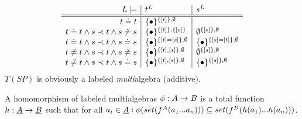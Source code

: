 \documentclass[10pt]{article}
\begin{document}
\[\begin{array}{r|l|l}
L\models & t^L & s^L\\ \hline\hline
t\mathrel{\dot{=} } t &  \{\bullet\}^{\{[t]\},\emptyset} & \\ 
t\mathrel{\dot{=} } t \land s\prec t \land s\not\mathrel{\dot{=} } s &  \{\bullet\}^{\{[t]\},\{[s]\}} &
\emptyset^{\{[s]\},\emptyset}\\
t\mathrel{\dot{=} } t \land s\prec t \land s\mathrel{\dot{=} } s &  \{\bullet\}^{\{[t]=[s]\},\emptyset} & \{\bullet\}^{\{[s]=[t]\},\emptyset} \\
t\not\mathrel{\dot{=} } t \land s\prec t \land s\not\mathrel{\dot{=} } s&  \{\bullet\}^{\{[t],[s]\},\emptyset} & 
\emptyset^{\{[s]\},\emptyset} \\
t\not\mathrel{\dot{=} } t \land s\prec t\land s\mathrel{\dot{=} } s &  \{\bullet\}^{\{[t],[s]\},\emptyset} & \{\bullet\}^{\{[s]\},\emptyset}
\end{array}
\]
$T(SP)$ is obviously a labeled {\em multi}algebra (additive). 

\begin{Definition}
A homomorphism of labeled multialgebras $\phi:A\rightarrow B$ is a total function
$h:\underline {A}\rightarrow \underline {B}$ such that for all $a_i\in\underline {A}:\phi(set(f^A(a_1...a_n))) \subseteq set(f^B(h(a_1)...h(a_n)))$.
\end{Definition}

%
%
\end{document}
